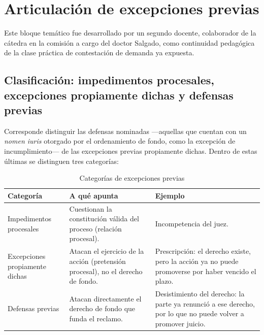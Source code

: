 \documentclass[12pt,oneside]{book}
\begin{document}
\chapter{Articulación de excepciones previas}

Este bloque temático fue desarrollado por un segundo docente, colaborador de la cátedra en la comisión a cargo del doctor Salgado, como continuidad pedagógica de la clase práctica de contestación de demanda ya expuesta.

\section{Clasificación: impedimentos procesales, excepciones propiamente dichas y defensas previas}

Corresponde distinguir las defensas nominadas —aquellas que cuentan con un \textit{nomen iuris} otorgado por el ordenamiento de fondo, como la excepción de incumplimiento— de las excepciones previas propiamente dichas. Dentro de estas últimas se distinguen tres categorías:

\begin{table}[H]
\centering
\caption{Categorías de excepciones previas}
\begin{tabularx}{\textwidth}{>{\raggedright\arraybackslash}p{} >{\raggedright\arraybackslash}p{} >{\raggedright\arraybackslash}X}
\toprule
\textbf{Categoría} & \textbf{A qué apunta} & \textbf{Ejemplo} \\
\midrule
Impedimentos procesales & Cuestionan la constitución válida del proceso (relación procesal). & Incompetencia del juez. \\
Excepciones propiamente dichas & Atacan el ejercicio de la acción (pretensión procesal), no el derecho de fondo. & Prescripción: el derecho existe, pero la acción ya no puede promoverse por haber vencido el plazo. \\
Defensas previas & Atacan directamente el derecho de fondo que funda el reclamo. & Desistimiento del derecho: la parte ya renunció a ese derecho, por lo que no puede volver a promover juicio. \\
\bottomrule
\end{tabularx}
\end{table}
\end{document}
